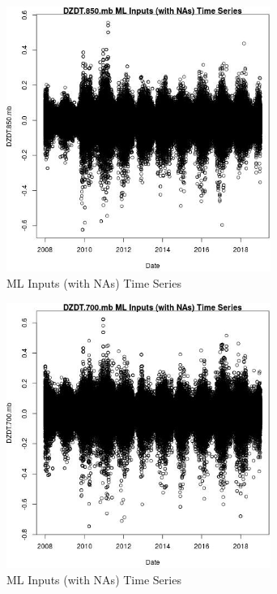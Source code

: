 \begin{figure} 
\centering  
\includegraphics[width=0.77\textwidth]{Code_Outputs/Report_ML_input_PM25_Step4_part_f_de_duplicated_aveswNAs_DZDT850mbvDate.jpg} 
\caption{\label{fig:Report_ML_input_PM25_Step4_part_f_de_duplicated_aveswNAsDZDT850mbvDate}ML Inputs (with NAs) Time Series} 
\end{figure} 
 

\begin{figure} 
\centering  
\includegraphics[width=0.77\textwidth]{Code_Outputs/Report_ML_input_PM25_Step4_part_f_de_duplicated_aveswNAs_DZDT700mbvDate.jpg} 
\caption{\label{fig:Report_ML_input_PM25_Step4_part_f_de_duplicated_aveswNAsDZDT700mbvDate}ML Inputs (with NAs) Time Series} 
\end{figure} 
 

